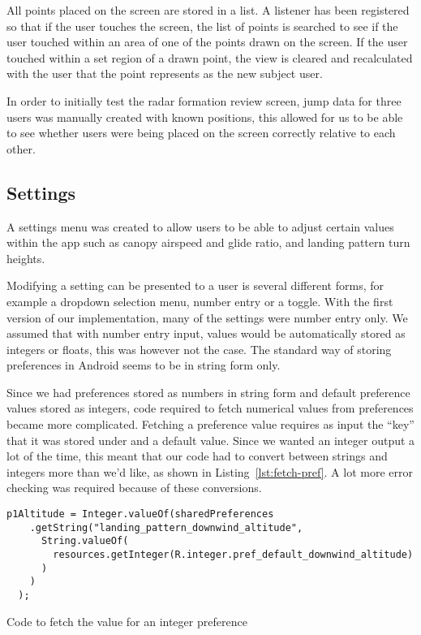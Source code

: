 All points placed on the screen are stored in a list. A listener has been registered so that if the user touches the screen, the list of points is searched to see if the user touched within an area of one of the points drawn on the screen. If the user touched within a set region of a drawn point, the view is cleared and recalculated with the user that the point represents as the new subject user.

In order to initially test the radar formation review screen, jump data for three users was manually created with known positions, this allowed for us to be able to see whether users were being placed on the screen correctly relative to each other.

\subsection{Settings}
A settings menu was created to allow users to be able to adjust certain values within the app such as canopy airspeed and glide ratio, and landing pattern turn heights.

Modifying a setting can be presented to a user is several different forms, for example a dropdown selection menu, number entry or a toggle. With the first version of our implementation, many of the settings were number entry only. We assumed that with number entry input, values would be automatically stored as integers or floats, this was however not the case. The standard way of storing preferences in Android seems to be in string form only.

Since we had preferences stored as numbers in string form and default preference values stored as integers, code required to fetch numerical values from preferences became more complicated.
Fetching a preference value requires as input the ``key'' that it was stored under and a default value. Since we wanted an integer output a lot of the time, this meant that our code had to convert between strings and integers more than we'd like, as shown in Listing~\ref{lst:fetch-pref}. A lot more error checking was required because of these conversions.

\begin{listing*}
  \centering
  \begin{verbatim}
p1Altitude = Integer.valueOf(sharedPreferences
    .getString("landing_pattern_downwind_altitude",
      String.valueOf(
        resources.getInteger(R.integer.pref_default_downwind_altitude)
      )
    )
  );
  \end{verbatim}
  \caption{Code to fetch the value for an integer preference}\label{lst:fetch-pref}
\end{listing*}

